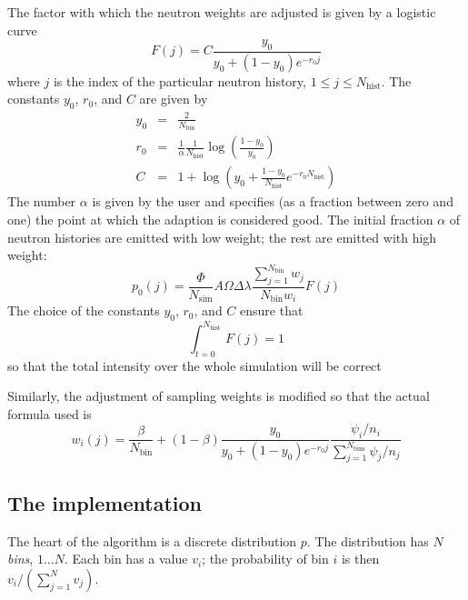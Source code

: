 The factor with which the neutron weights are adjusted is given by a
logistic curve
\begin{equation}
  F(j) = C\frac{y_0}{y_0 + (1 - y_0) e^{-r_0 j}}
\end{equation}
where $j$ is the index of the particular neutron history, $1 \leq j
\leq N_\textrm{hist}$. The constants $y_0$, $r_0$, and $C$ are given by
\begin{eqnarray}
  y_0 &=& \frac{2}{N_\textrm{bin}} \\
  r_0 &=& \frac{1}{\alpha}\frac{1}{N_\textrm{hist}}
     \log\left(\frac{1 - y_0}{y_0}\right) \\
  C &=& 1 + \log\left(y_0 + \frac{1 - y_0}{N_\textrm{hist}}
     e^{-r_0 N_\textrm{hist}}\right)
\end{eqnarray}
The number $\alpha$ is given by the user and specifies (as a fraction
between zero and one) the point at which the adaption is considered
good. The initial fraction $\alpha$ of neutron histories are emitted
with low weight; the rest are emitted with high weight:
\begin{equation}
  p_0(j) =
    \frac{\Phi}{N_\textrm{sim}} A \Omega \Delta\lambda
    \frac{\sum_{j=1}^{N_\textrm{bin}} w_j}{N_\textrm{bin} w_i}
    F(j)
\end{equation}
The choice of the constants $y_0$, $r_0$, and $C$ ensure that
\begin{equation}
\int_{t=0}^{N_\textrm{hist}} F(j) = 1
\end{equation}
so that the total intensity over the whole simulation will be correct

Similarly, the adjustment of sampling weights is modified so that the
actual formula used is
\begin{equation}
w_i(j) = \frac{\beta}{N_\textrm{bin}} +
    (1-\beta) \frac{y_0}{y_0 + (1 - y_0) e^{-r_0 j}}
     \frac{\psi_i/n_i}{\sum_{j=1}^{N_\textrm{bins}} \psi_j/n_j}
\end{equation}

\subsection{The implementation}

The heart of the algorithm is a discrete distribution $p$. The
distribution has $N$ \emph{bins}, $1\ldots N$. Each bin has a value
$v_i$; the probability of bin $i$ is then $v_i/(\sum_{j=1}^N v_j)$.

